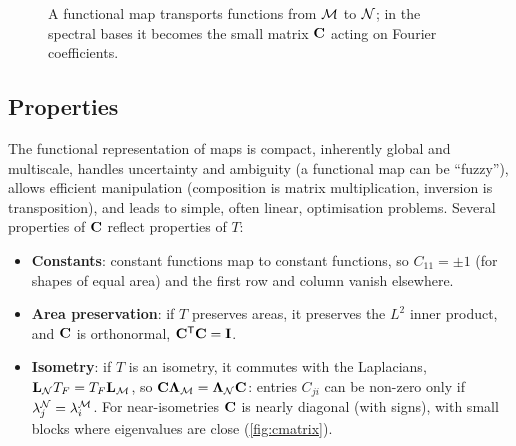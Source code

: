 \begin{figure}[tbp]
\centering
{}
\caption{A functional map transports functions from $\mathcal{M}$ to $\mathcal{N}$; in the spectral bases it becomes the
small matrix $\mathbf{C}$ acting on Fourier coefficients.}
\label{fig:fmap-diagram}
\end{figure}

\subsection{Properties}

The functional representation of maps is compact, inherently global and multiscale, handles
uncertainty and ambiguity (a functional map can be ``fuzzy''), allows efficient manipulation
(composition is matrix multiplication, inversion is transposition), and leads to simple, often
linear, optimisation problems. Several properties of $\mathbf{C}$ reflect properties of $T$:
\begin{itemize}
  \item \textbf{Constants}: constant functions map to constant functions, so $C_{11}=\pm1$ (for shapes
  of equal area) and the first row and column vanish elsewhere.
  \item \textbf{Area preservation}: if $T$ preserves areas, it preserves the $L^2$ inner product, and
  $\mathbf{C}$ is orthonormal, $\mathbf{C}^{\mathsf{T}}\mathbf{C}=\mathbf{I}$.
  \item \textbf{Isometry}: if $T$ is an isometry, it commutes with the Laplacians,
  $\mathbf{L}_{\mathcal{N}} T_F=T_F\mathbf{L}_{\mathcal{M}}$, so $\mathbf{C}\boldsymbol{\Lambda}_{\mathcal{M}}=\boldsymbol{\Lambda}_{\mathcal{N}}\mathbf{C}$: entries $C_{ji}$ can be non-zero only if
  $\lambda^{\mathcal{N}}_j=\lambda^{\mathcal{M}}_i$. For near-isometries $\mathbf{C}$ is nearly diagonal (with signs), with small
  blocks where eigenvalues are close (\cref{fig:cmatrix}).
\end{itemize}


